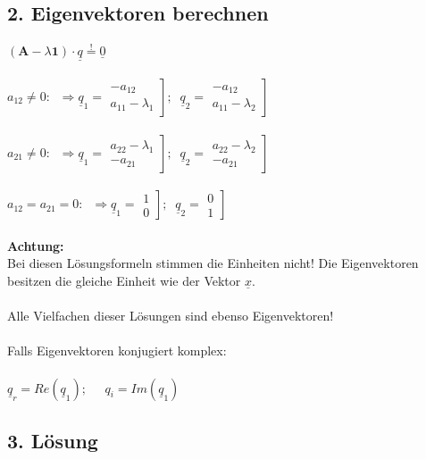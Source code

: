 \documentclass[a4paper,twocolumn,10pt]{article}
\newcommand{\sollsein}{\stackrel{!}{=}}
\begin{document}
\subsection*{2. Eigenvektoren berechnen}
$(\textbf{A}-\lambda \textbf{1})\cdot \underline{q}\sollsein \underline{0}$\\\\
$a_{12}\ne 0:\;\;\Rightarrow \underline{q}_1=\left.\begin{matrix}-a_{12} \\ a_{11}-\lambda_1\end{matrix}\right];\;\; \underline{q}_2=\left.\begin{matrix}-a_{12} \\ a_{11}-\lambda_2\end{matrix}\right]$\\\\
$a_{21}\ne 0:\;\;\Rightarrow \underline{q}_1=\left.\begin{matrix}a_{22}-\lambda_1 \\ -a_{21}\end{matrix}\right];\;\; \underline{q}_2=\left.\begin{matrix}a_{22}-\lambda_2 \\ -a_{21}\end{matrix}\right]$\\\\
$a_{12}=a_{21}= 0:\;\;\Rightarrow \underline{q}_1=\left.\begin{matrix}1 \\ 0\end{matrix}\right];\;\; \underline{q}_2=\left.\begin{matrix}0 \\ 1\end{matrix}\right]$\\\\
\textbf{Achtung:}\\
Bei diesen Lösungsformeln stimmen die Einheiten nicht! Die Eigenvektoren besitzen die gleiche Einheit wie der Vektor $\underline{x}$.\\\\
Alle Vielfachen dieser Lösungen sind ebenso Eigenvektoren!\\\\
Falls Eigenvektoren konjugiert komplex:\\\\
$\underline{q}_r=Re(\underline{q}_1);\;\;\;\;\;q_i=Im(\underline{q}_1)$
\subsection*{3. Lösung}
\end{document}
